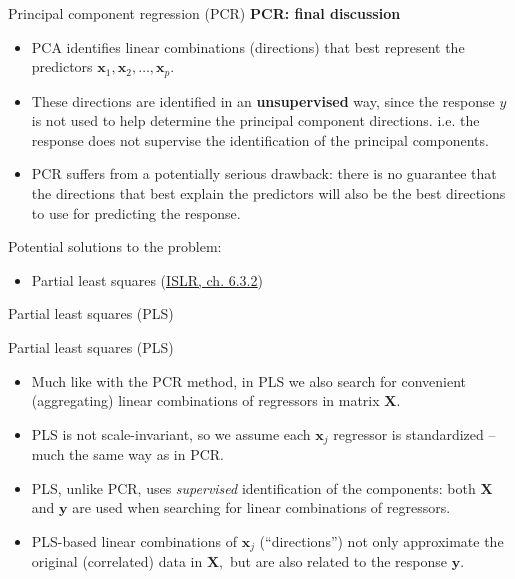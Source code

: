 \documentclass{beamer}
\begin{document}
\begin{frame}{Principal component regression (PCR)}
\textbf{PCR: final discussion}
\medskip
\begin{itemize}
\item PCA identifies linear combinations (directions) that best
represent the predictors $\bm{x}_1, \bm{x}_2, \dots , \bm{x}_p$.
\item These directions are identified in an \textbf{unsupervised} way, since the response $y$ is not used to help determine the principal component directions. i.e. the response does not supervise the identification of the principal components.
\item PCR suffers from a potentially serious drawback: there is no guarantee that the directions that best explain the predictors will also be the best directions to use for predicting the response.
\end{itemize}
\medskip
Potential solutions to the problem:
\begin{itemize}
\item Partial least squares (\textcolor{blue}{\underline{\href{http://www-bcf.usc.edu/~gareth/ISL/}{ISLR, ch. 6.3.2}}})
\end{itemize}
\end{frame}
\begin{frame}{Partial least squares (PLS)}
\end{frame}
\begin{frame}{Partial least squares (PLS)}
\begin{itemize}
\item Much like with the PCR method, in PLS we also search for convenient (aggregating) linear combinations of regressors in matrix $\bm{X}$.\\
\medskip
\item PLS is not scale-invariant, so we assume each $\bm{x}_j$ regressor is standardized -- much the same way as in PCR.\\
\medskip
\item PLS, unlike PCR, uses \textit{supervised} identification of the components: both $\bm{X}$ and $\bm{y}$ are used when searching for linear combinations of regressors.\\
\medskip
\item PLS-based linear combinations of $\bm{x}_j$ (``directions'') not only approximate the original (correlated) data in $\bm{X},$ but are also related to the response $\bm{y}$.
\end{itemize}
\end{frame}
\end{document}
